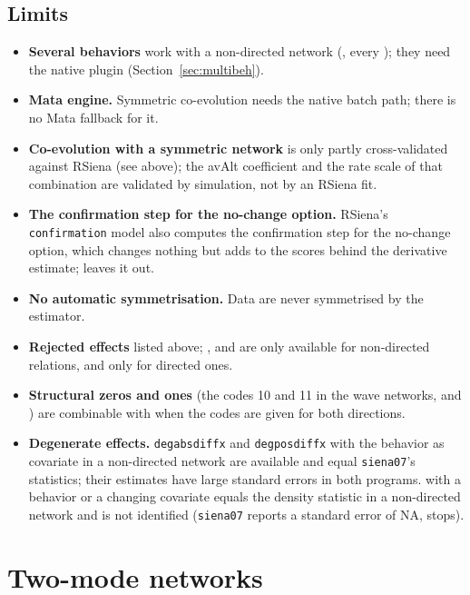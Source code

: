 \subsection{Limits}\label{sec:sym-limits}

\begin{itemize}
\item \textbf{Several behaviors} work with a non-directed network (, every ); they need the native plugin (Section~\ref{sec:multibeh}).
\item \textbf{Mata engine.} Symmetric co-evolution needs the native batch path; there is no Mata fallback for it.
\item \textbf{Co-evolution with a symmetric network} is only partly cross-validated against RSiena (see above); the avAlt coefficient and the rate scale of that combination are validated by simulation, not by an RSiena fit.
\item \textbf{The confirmation step for the no-change option.} RSiena's \texttt{confirmation} model also computes the confirmation step for the no-change option, which changes nothing but adds to the scores behind the derivative estimate; \nwsaom{} leaves it out.
\item \textbf{No automatic symmetrisation.} Data are never symmetrised by the estimator.
\item \textbf{Rejected effects} listed above; ,  and  are only available for non-directed relations,  and  only for directed ones.
\item \textbf{Structural zeros and ones} (the codes 10 and 11 in the wave networks, and ) are combinable with  when the codes are given for both directions.
\item \textbf{Degenerate effects.} \texttt{degabsdiffx} and \texttt{degposdiffx} with the behavior as covariate in a non-directed network are available and equal \texttt{siena07}'s statistics; their estimates have large standard errors in both programs.  with a behavior or a changing covariate equals the density statistic in a non-directed network and is not identified (\texttt{siena07} reports a standard error of NA, \nwsaom{} stops).
\end{itemize}

\section{Two-mode networks}\label{sec:twomode}

